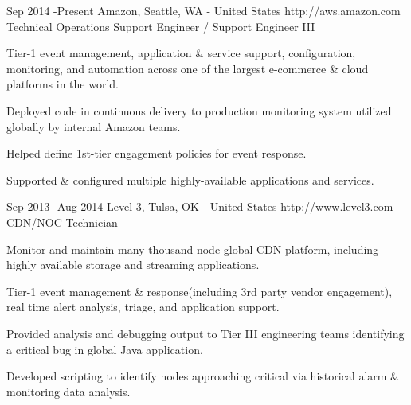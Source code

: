 \documentclass[10pt]{article} %
\begin{document}
\job
{Sep 2014 -}{Present}
{Amazon, Seattle, WA - United States}
{http://aws.amazon.com}
{Technical Operations Support Engineer / Support Engineer III}
{
\begin{itemize-noindent}
\item{Tier-1 event management, application \& service support, configuration, monitoring, and automation across one of the largest e-commerce \& cloud platforms in the world.}
\item{Deployed code in continuous delivery to production monitoring system utilized globally by internal Amazon teams.}
\item{Helped define 1st-tier engagement policies for event response.}
\item{Supported \& configured multiple highly-available applications and services.}
\end{itemize-noindent}

}



\job
{Sep 2013 -}{Aug 2014}
{Level 3, Tulsa, OK - United States}
{http://www.level3.com}
{CDN/NOC Technician}
{
\begin{itemize-noindent}
\item{Monitor and maintain many thousand node global CDN platform, including highly available storage and streaming applications.}
\item{Tier-1 event management \& response(including 3rd party vendor engagement), real time alert analysis, triage, and application support.}
\item{Provided analysis and debugging output to Tier III engineering teams identifying a critical bug in global Java application.}
\item{Developed scripting to identify nodes approaching critical via historical alarm \& monitoring data analysis.}
\end{itemize-noindent}

}

\end{document}
